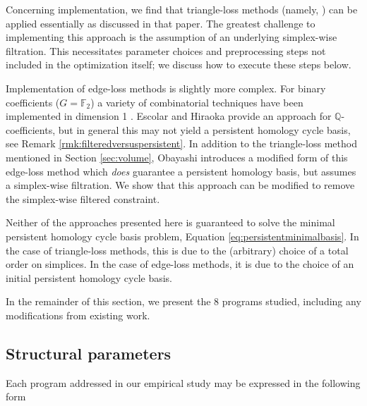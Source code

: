 \documentclass[utf8]{formatting_stuff/frontiersFPHY}
\newcommand{\Q}{\mathbb{Q}}
\newcommand{\field}{\mathbb{F}}
\newcommand{\se}{Section }
\newcommand{\eq}{Equation }
\theoremstyle{plain}
\theoremstyle{definition}
\begin{document}
Concerning implementation, we find that triangle-loss methods (namely, \cite{Obayashi2018}) can be applied essentially as discussed in that paper.  The greatest challenge to implementing this approach is the assumption of an underlying simplex-wise filtration. This necessitates parameter choices and preprocessing steps not included in the optimization itself; we discuss how to execute these steps below.  

Implementation of edge-loss methods is slightly more complex.  For binary coefficients ($G = \field_2$) a variety of combinatorial techniques have been implemented in dimension 1 \cite{chenquantifying, zhang2019heuristic}.  Escolar and Hiraoka \cite{Escolar2016} provide an approach for $\Q$-coefficients, but in general this may not yield a persistent homology cycle basis, see Remark \ref{rmk:filteredversuspersistent}.   
In addition to the triangle-loss method mentioned in \se \ref{sec:volume}, Obayashi \cite{Obayashi2018} introduces a modified form of this edge-loss method which \emph{does} guarantee a persistent homology basis, but assumes a simplex-wise filtration.  We show that this approach can be modified to remove the simplex-wise filtered constraint.

Neither of the approaches presented here is guaranteed to solve the minimal persistent homology cycle basis problem, \eq \eqref{eq:persistentminimalbasis}.  In the case of triangle-loss methods, this is due to the (arbitrary) choice of a total order on simplices.  In the case of edge-loss methods, it is due to the choice of an initial persistent homology cycle basis.  

In the remainder of this section, we present the 8 programs studied, including any modifications from existing work.

\subsection{Structural parameters}
\label{sec_structuralparams}

Each program addressed in our empirical study may be expressed in the following form
\end{document}
